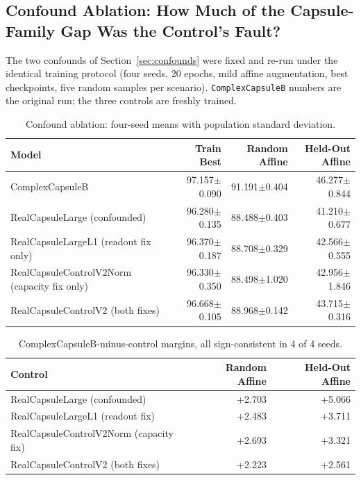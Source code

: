 \documentclass[11pt]{article}
\begin{document}
\subsection{Confound Ablation: How Much of the Capsule-Family Gap Was the Control's Fault?}
\label{sec:ablation}
The two confounds of Section~\ref{sec:confounds} were fixed and re-run under the identical training protocol (four seeds, 20 epochs, mild affine augmentation, best checkpoints, five random samples per scenario). \texttt{ComplexCapsuleB} numbers are the original run; the three controls are freshly trained.

\begin{table}[t]
\centering
\small
\begin{tabular}{lrrr}
\toprule
Model & Train Best & Random Affine & Held-Out Affine \\
\midrule
ComplexCapsuleB & 97.157$\pm$0.090 & 91.191$\pm$0.404 & 46.277$\pm$0.844 \\
RealCapsuleLarge (confounded) & 96.280$\pm$0.135 & 88.488$\pm$0.403 & 41.210$\pm$0.677 \\
RealCapsuleLargeL1 (readout fix only) & 96.370$\pm$0.187 & 88.708$\pm$0.329 & 42.566$\pm$0.555 \\
RealCapsuleControlV2Norm (capacity fix only) & 96.330$\pm$0.350 & 88.498$\pm$1.020 & 42.956$\pm$1.846 \\
RealCapsuleControlV2 (both fixes) & 96.668$\pm$0.105 & 88.968$\pm$0.142 & 43.715$\pm$0.316 \\
\bottomrule
\end{tabular}
\caption{Confound ablation: four-seed means with population standard deviation.}
\label{tab:ablation-main}
\end{table}

\begin{table}[t]
\centering
\small
\begin{tabular}{lrr}
\toprule
Control & Random Affine & Held-Out Affine \\
\midrule
RealCapsuleLarge (confounded) & +2.703 & +5.066 \\
RealCapsuleLargeL1 (readout fix) & +2.483 & +3.711 \\
RealCapsuleControlV2Norm (capacity fix) & +2.693 & +3.321 \\
RealCapsuleControlV2 (both fixes) & +2.223 & +2.561 \\
\bottomrule
\end{tabular}
\caption{ComplexCapsuleB-minus-control margins, all sign-consistent in 4 of 4 seeds.}
\label{tab:ablation-margins}
\end{table}
\end{document}
